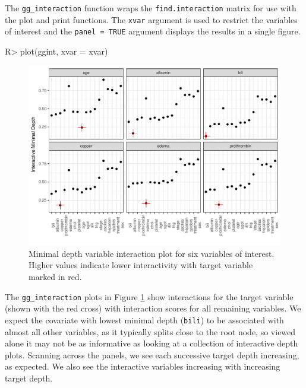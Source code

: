 \documentclass[article, nojss]{jss}
\begin{document}
The \texttt{gg\_interaction} function wraps the
\texttt{find.interaction} matrix for use with the 
plot and print functions. The \texttt{xvar} argument is used to restrict
the variables of interest and the \texttt{panel\ =\ TRUE} argument
displays the results in a single figure.

\begin{Schunk}
\begin{Sinput}
R> plot(ggint, xvar = xvar)
\end{Sinput}
\begin{figure}[!htb]

{\centering \includegraphics{rfs-interactionPanel-1}

}

\caption[Minimal depth variable interaction plot for six variables of interest]{Minimal depth variable interaction plot for six variables of interest. Higher values indicate lower interactivity with target variable marked in red.}\label{fig:interactionPanel}
\end{figure}
\end{Schunk}

The \texttt{gg\_interaction} plots in Figure \ref{fig:interactionPanel}
show interactions for the target variable (shown with the red cross)
with interaction scores for all remaining variables. We expect the
covariate with lowest minimal depth (\texttt{bili}) to be associated
with almost all other variables, as it typically splits close to the
root node, so viewed alone it may not be as informative as looking at a
collection of interactive depth plots. Scanning across the panels, we
see each successive target depth increasing, as expected. We also see
the interactive variables increasing with increasing target depth.
\end{document}
